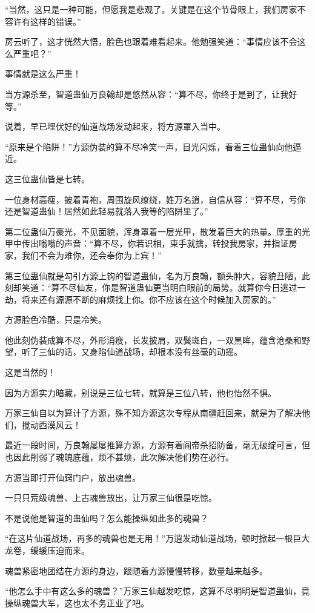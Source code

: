 \begin{this_body}
“当然，这只是一种可能，但愿我是悲观了。关键是在这个节骨眼上，我们房家不容许有这样的错误。”

房云听了，这才恍然大悟，脸色也跟着难看起来。他勉强笑道：“事情应该不会这么严重吧？”

事情就是这么严重！

当方源杀至，智道蛊仙万良翰却是悠然从容：“算不尽，你终于是到了，让我好等。”

说着，早已埋伏好的仙道战场发动起来，将方源罩入当中。

“原来是个陷阱！”方源伪装的算不尽冷笑一声，目光闪烁，看着三位蛊仙向他逼近。

这三位蛊仙皆是七转。

一位身材高瘦，披着青袍，周围旋风缭绕，姓万名逍，自信从容：“算不尽，亏你还是智道蛊仙！居然如此轻易就落入我等的陷阱里了。”

第二位蛊仙万豪光，不见面貌，浑身罩着一层光甲，散发着巨大的热量。厚重的光甲中传出嗡嗡的声音：“算不尽，你若识相，束手就擒，转投我房家，并指证房家，我们不会为难你，还会奉你为上宾！”

第三位蛊仙就是勾引方源上钩的智道蛊仙，名为万良翰，额头肿大，容貌丑陋，此刻却笑道：“算不尽仙友，你是智道蛊仙更当明白眼前的局势。就算你今日逃过一劫，将来还有源源不断的麻烦找上你。你不应该在这个时候加入房家的。”

方源脸色冷酷，只是冷笑。

他此刻伪装成算不尽，外形消瘦，长发披肩，双鬓斑白，一双黑眸，蕴含沧桑和野望，听了三仙的话，又身陷仙道战场，却根本没有丝毫的动摇。

这是当然的！

因为方源实力暗藏，别说是三位七转，就算是三位八转，他也怡然不惧。

万家三仙自以为算计了方源，殊不知方源这次专程从南疆赶回来，就是为了解决他们，搅动西漠风云！

最近一段时间，万良翰屡屡推算方源，方源有着阎帝杀招防备，毫无破绽可言，但也因此削弱了魂魄底蕴，烦不甚烦，此次解决他们势在必行。

方源当即打开仙窍门户，放出魂兽。

一只只荒级魂兽、上古魂兽放出，让万家三仙很是吃惊。

不是说他是智道的蛊仙吗？怎么能操纵如此多的魂兽？

“在这片仙道战场，再多的魂兽也是无用！”万逍发动仙道战场，顿时掀起一根巨大龙卷，缓缓压迫而来。

魂兽紧密地团结在方源的身边，跟随着方源慢慢转移，数量越来越多。

“他怎么手中有这么多的魂兽？”万家三仙越发吃惊，这算不尽明明是智道蛊仙，竟操纵魂兽大军，这也太不务正业了吧。


\end{this_body}
